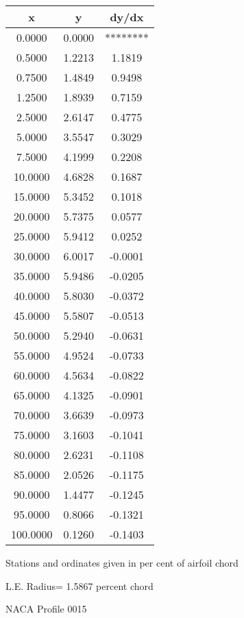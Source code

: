 \documentclass[11pt]{book}
\begin{document}
 \vspace{8mm}
 \begin{tabular}{|c|c|c|} \hline 
  x  &  y  &  dy/dx \\
 \hline
0.0000 & 0.0000 & ******** \\
0.5000 & 1.2213 & 1.1819 \\
0.7500 & 1.4849 & 0.9498 \\
1.2500 & 1.8939 & 0.7159 \\
2.5000 & 2.6147 & 0.4775 \\
5.0000 & 3.5547 & 0.3029 \\
7.5000 & 4.1999 & 0.2208 \\
10.0000 & 4.6828 & 0.1687 \\
15.0000 & 5.3452 & 0.1018 \\
20.0000 & 5.7375 & 0.0577 \\
25.0000 & 5.9412 & 0.0252 \\
30.0000 & 6.0017 & -0.0001 \\
35.0000 & 5.9486 & -0.0205 \\
40.0000 & 5.8030 & -0.0372 \\
45.0000 & 5.5807 & -0.0513 \\
50.0000 & 5.2940 & -0.0631 \\
55.0000 & 4.9524 & -0.0733 \\
60.0000 & 4.5634 & -0.0822 \\
65.0000 & 4.1325 & -0.0901 \\
70.0000 & 3.6639 & -0.0973 \\
75.0000 & 3.1603 & -0.1041 \\
80.0000 & 2.6231 & -0.1108 \\
85.0000 & 2.0526 & -0.1175 \\
90.0000 & 1.4477 & -0.1245 \\
95.0000 & 0.8066 & -0.1321 \\
100.0000 & 0.1260 & -0.1403 \\
 \hline
 \end{tabular}
 \vspace{8mm}


Stations and ordinates given in per cent of airfoil chord 


L.E. Radius=  1.5867 percent chord
 \newpage
  \label{p0015}
 \begin{Large}
 NACA Profile 0015
 \end{Large}
  
\end{document}
